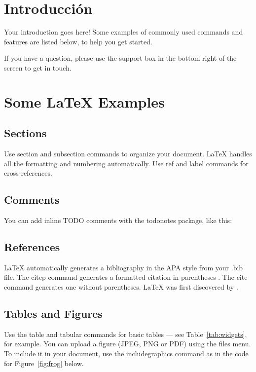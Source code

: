 \documentclass[a4paper,man,natbib]{apa6}
\begin{document}



\section{Introducción}

Your introduction goes here! Some examples of commonly used commands and features are listed below, to help you get started.

If you have a question, please use the support box in the bottom right of the screen to get in touch.

\section{Some \LaTeX{} Examples}
\label{sec:examples}

\subsection{Sections}

Use section and subsection commands to organize your document. \LaTeX{} handles all the formatting and numbering automatically. Use ref and label commands for cross-references.

\subsection{Comments}

You can add inline TODO comments with the todonotes package, like this:

\subsection{References}

LaTeX automatically generates a bibliography in the APA style from your .bib file. The citep command generates a formatted citation in parentheses \citep{Lamport1986}. The cite command generates one without parentheses. LaTeX was first discovered by \cite{Lamport1986}.

\subsection{Tables and Figures}

Use the table and tabular commands for basic tables --- see Table~\ref{tab:widgets}, for example. You can upload a figure (JPEG, PNG or PDF) using the files menu. To include it in your document, use the includegraphics command as in the code for Figure~\ref{fig:frog} below.
\end{document}
